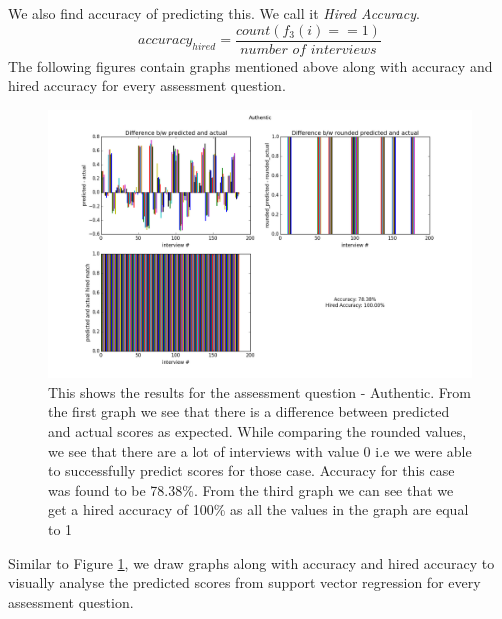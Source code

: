 \documentclass[11pt]{article}
\begin{document}
We also find accuracy of predicting this. We call it \textit{Hired Accuracy}.
\begin{equation}
 accuracy_{hired} = \frac{count(f_3(i) == 1)}{\textit{number of interviews}}
\end{equation}
The following figures contain graphs mentioned above along with accuracy and hired accuracy for every assessment question.



\begin{figure}[H]
\begin{center}
\includegraphics[width=1\columnwidth]{figures2/Authentic.png}
\caption{This shows the results for the assessment question - Authentic. From the first graph we see that there is a difference between predicted and actual scores as expected. While comparing the rounded values, we see that there are a lot of interviews with value 0 i.e we were able to successfully predict scores for those case. Accuracy for this case was found to be 78.38\%. From the third graph we can see that we get a hired accuracy of 100\% as all the values in the graph are equal to 1}
\label{fig:Authentic_svr}
\end{center}
\end{figure}

Similar to Figure \ref{fig:Authentic_svr}, we draw graphs along with accuracy and hired accuracy to visually analyse the predicted scores from support vector regression for every assessment question.
\end{document}

